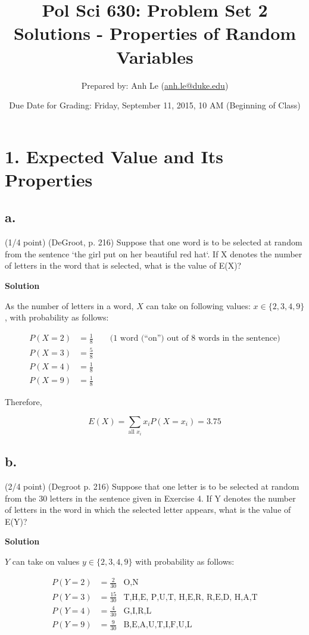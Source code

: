 \documentclass{article}\usepackage[]{graphicx}\usepackage[]{color}
\title{Pol Sci 630: Problem Set 2 Solutions - Properties of Random Variables}
\author{Prepared by: Anh Le (\href{mailto:anh.le@duke.edu}{anh.le@duke.edu})}
\date{Due Date for Grading: Friday, September 11, 2015, 10 AM (Beginning of Class)}
\begin{document}
\maketitle

\section*{1. Expected Value and Its Properties}

\subsection*{a.} (1/4 point) (DeGroot, p. 216) Suppose that one word is to be selected at random from the sentence `the girl put on her beautiful red hat`. If X denotes the number of letters in the word that is selected, what is the value of E(X)?

\textbf{Solution}

As the number of letters in a word, $X$ can take on following values: $x \in \{2, 3, 4, 9 \}$, with probability as follows:

\begin{align}
P(X = 2) &= \frac{1}{8} \qquad \text{(1 word (``on'') out of 8 words in the sentence)} \\
P(X = 3) &= \frac{5}{8} \\
P(X = 4) &= \frac{1}{8} \\
P(X = 9) &= \frac{1}{8}
\end{align}

Therefore,

$$E(X) = \sum_{\text{all $x_i$}} x_i P(X = x_i) = 3.75$$

\subsection*{b.} (2/4 point) (Degroot p. 216) Suppose that one letter is to be selected at random from the 30 letters in the sentence given in Exercise 4. If Y denotes the number of letters in the word in which the selected letter appears, what is the value of E(Y)?

\textbf{Solution}

$Y$ can take on values $y \in \{2, 3, 4, 9 \}$ with probability as follows:

\begin{align}
P(Y = 2) &= \frac{2}{30} &\text{O,N} \\
P(Y = 3) &= \frac{15}{30} &\text{T,H,E, P,U,T, H,E,R, R,E,D, H,A,T} \\
P(Y = 4) &= \frac{4}{30} &\text{G,I,R,L} \\
P(Y = 9) &= \frac{9}{30} &\text{B,E,A,U,T,I,F,U,L}
\end{align}
\end{document}
